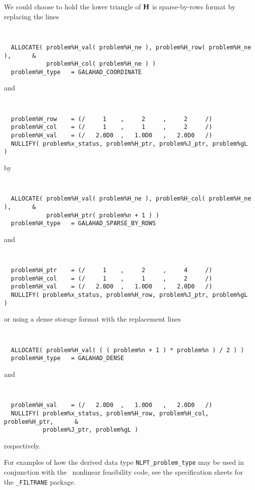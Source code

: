 \documentclass{galahad}
\newcommand{\packagename}{NLPT}
\begin{document}
\noindent
We could choose to hold the lower triangle of ${\mathbf{H}}$ is sparse-by-rows format
by replacing the lines
{\tt \small
\begin{verbatim}
  ALLOCATE( problem%H_val( problem%H_ne ), problem%H_row( problem%H_ne ),      &
            problem%H_col( problem%H_ne ) )
  problem%H_type   = GALAHAD_COORDINATE
\end{verbatim}
}
\noindent
and
{\tt \small
\begin{verbatim}
  problem%H_row    = (/     1    ,     2     ,     2     /)
  problem%H_col    = (/     1    ,     1     ,     2     /)
  problem%H_val    = (/   2.0D0  ,   1.0D0   ,   2.0D0   /)
  NULLIFY( problem%x_status, problem%H_ptr, problem%J_ptr, problem%gL )
\end{verbatim}
}
\noindent
by
{\tt \small
\begin{verbatim}
  ALLOCATE( problem%H_val( problem%H_ne ), problem%H_col( problem%H_ne ),      &
            problem%H_ptr( problem%n + 1 ) )
  problem%H_type   = GALAHAD_SPARSE_BY_ROWS
\end{verbatim}
}
\noindent
and
{\tt \small
\begin{verbatim}
  problem%H_ptr    = (/     1    ,     2     ,     4     /)
  problem%H_col    = (/     1    ,     1     ,     2     /)
  problem%H_val    = (/   2.0D0  ,   1.0D0   ,   2.0D0   /)
  NULLIFY( problem%x_status, problem%H_row, problem%J_ptr, problem%gL )
\end{verbatim}
}
\noindent
or using a dense storage format with the replacement lines
{\tt \small
\begin{verbatim}
  ALLOCATE( problem%H_val( ( ( problem%n + 1 ) * problem%n ) / 2 ) )
  problem%H_type   = GALAHAD_DENSE
\end{verbatim}
}
\noindent
and 
{\tt \small
\begin{verbatim}
  problem%H_val    = (/   2.0D0  ,   1.0D0   ,   2.0D0   /)
  NULLIFY( problem%x_status, problem%H_row, problem%H_col, problem%H_ptr,      &
           problem%J_ptr, problem%gL )
\end{verbatim}
}
\noindent
respectively.

For examples of how the derived data type
{\tt \packagename\_problem\_type} may be used in conjunction with the
\galahad\ nonlinear feasibility code, see the specification sheets 
for the {\tt \libraryname\_FILTRANE} package.
\end{document}
